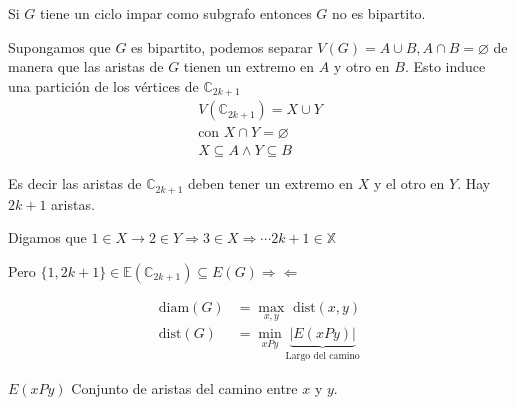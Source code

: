 \documentclass[../main.tex]{subfiles}
\begin{document}
\teorema
Si $G$ tiene un ciclo impar como subgrafo entonces $G$ no es bipartito.

\begin{figure}[H]
	\centering
	
\end{figure}

\demostracion
Supongamos que $G$ es bipartito, podemos separar
$V(G)=A\cup B, A\cap B=\varnothing$ de manera que las aristas de $G$ tienen un
extremo en $A$ y otro en $B$.
Esto induce una partición de los vértices de $\mathbb{C}_{2k+1}$
\begin{gather*}
	V(\mathbb{C}_{2k+1})=X \cup Y\\
	\text{con } X\cap Y = \varnothing\\
	X \subseteq A \wedge Y\subseteq B
\end{gather*}

Es decir las aristas de $\mathbb{C}_{2k+1}$ deben tener un extremo en $X$ y el
otro en $Y$.
Hay $2k+1$ aristas.

Digamos que $1\in X\rightarrow 2\in Y \Rightarrow 3\in X \Rightarrow \cdots
2k+1\in \mathbb{X}$

Pero $\{1,2k+1\}\in\mathbb{E}
(\mathbb{C}_{2k+1})
\subseteq E(G)\Rightarrow\Leftarrow$

\begin{align*}
	\text{diam}(G) &= \max_{x,y} \text{ dist}(x,y)\\
	\text{dist}(G) &= \min_{xPy}
	\underbrace
	{
		| E(xPy) |
	}_
	{
		\text{Largo del camino}
	}
\end{align*}

$E(xPy)$ Conjunto de aristas del camino entre $x$ y $y$.
\end{document}
